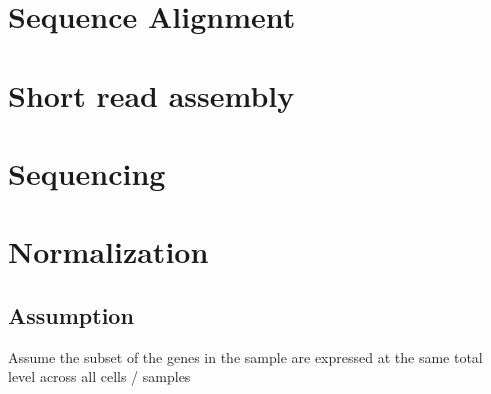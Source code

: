 \documentclass[font=12pt]{article}
\begin{document}
\medskip
\setcounter{section}{1}
\section{Sequence Alignment}

\newpage
\section{Short read assembly}

\newpage
\section{Sequencing}

\newpage
\section{Normalization}
\subsection*{Assumption}
Assume the subset of the genes in the sample are expressed at the same total level across all cells / samples
\end{document}
